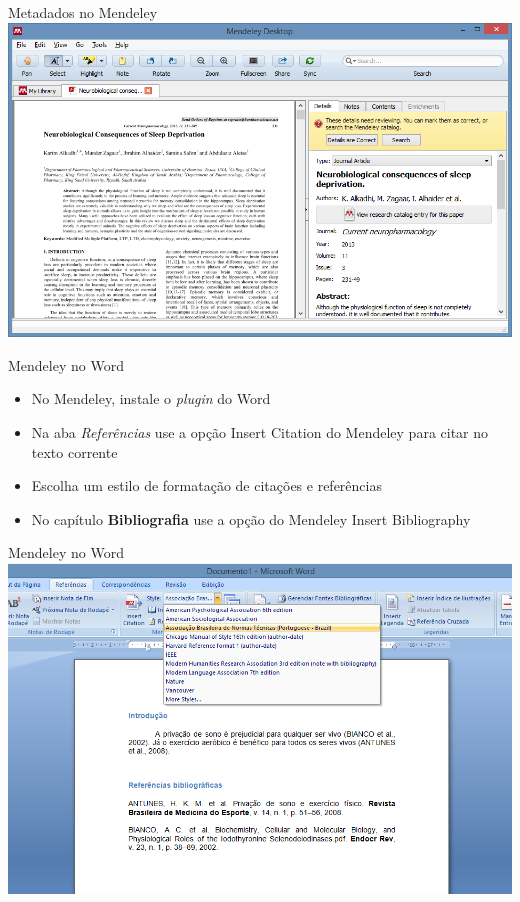 \documentclass{beamer}
\begin{document}
\begin{frame}{Metadados no Mendeley}
  \centering
  \includegraphics[width=\textwidth]{Referencias/mendeley-busca2}
\end{frame}

\begin{frame}{Mendeley no Word}
  \begin{itemize}
    \footnotesize
  \item No Mendeley, instale o {\em plugin} do Word
  \item Na aba {\em Referências} use a opção \alert{Insert Citation}
    do Mendeley para citar no texto corrente
  \item Escolha um estilo de formatação de citações e referências
  \item No capítulo {\bf Bibliografia} use a opção do Mendeley
    \alert{Insert Bibliography}
  \end{itemize}
\end{frame}

\begin{frame}{Mendeley no Word}
  \centering
  \includegraphics[width=1.1\textwidth]{Referencias/mendeley-word-ABNT}
\end{frame}
\end{document}
